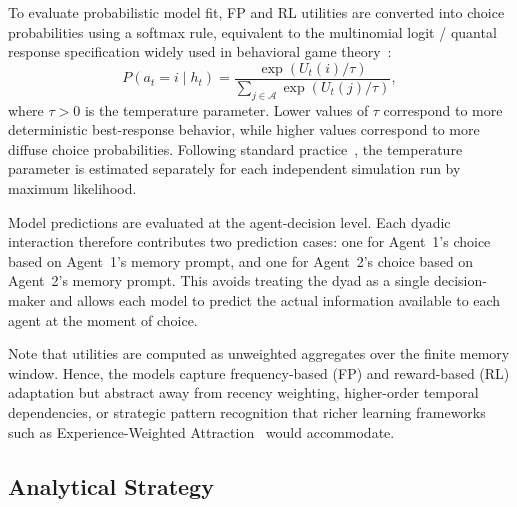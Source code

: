 \documentclass{article}
\begin{document}
To evaluate probabilistic model fit, FP and RL utilities are converted into choice probabilities using a softmax rule, equivalent to the multinomial logit / quantal response specification widely used in behavioral game theory~\cite{mckelvey1995quantal,camerer1999ewa}:
\begin{equation}
P(a_t = i \mid h_t) =
\frac{\exp\left(U_t(i)/\tau\right)}
{\sum_{j \in \mathcal{A}} \exp\left(U_t(j)/\tau\right)},
\end{equation}
where $\tau > 0$ is the temperature parameter. Lower values of $\tau$ correspond to more deterministic best-response behavior, while higher values correspond to more diffuse choice probabilities. Following standard practice~\cite{camerer1999ewa,erev1998predicting}, the temperature parameter is estimated separately for each independent simulation run by maximum likelihood.

Model predictions are evaluated at the agent-decision level. Each dyadic interaction therefore contributes two prediction cases: one for Agent~1's choice based on Agent~1's memory prompt, and one for Agent~2's choice based on Agent~2's memory prompt. This avoids treating the dyad as a single decision-maker and allows each model to predict the actual information available to each agent at the moment of choice.

Note that utilities are computed as unweighted aggregates over the finite memory window. Hence, the models capture frequency-based (FP) and reward-based (RL) adaptation but abstract away from recency weighting, higher-order temporal dependencies, or strategic pattern recognition that richer learning frameworks such as Experience-Weighted Attraction~\cite{camerer1999ewa} would accommodate.

\subsection{Analytical Strategy}
\end{document}
